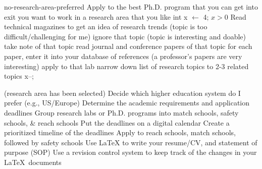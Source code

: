 \begin{codebox}
\zi	{}
\zi	{}
\zi
\li \If no-research-area-preferred	\label{apply-grad-sch-no-research-area1}
\li	\Then Apply to the best Ph.D. program that you can get into	\label{apply-grad-sch-no-research-area2}
\li	exit					
\li \ElseIf you want to work in a research area that you like
\zi	\Then
\li	int x $\gets$ 4;
\zi
\li	\While $x > 0$
	\Do
\li		Read technical magazines to get an idea of research trends
\zi		{}
\zi
\li		\If (topic is too difficult/challenging for me)
		\Then
\li			ignore that topic
\li		\ElseIf (topic is interesting and doable)
		\Then
\li			take note of that topic
\li			read journal and conference papers of that topic
\li			for each paper, enter it into your database of references		\label{apply-grad-sch-db-ref}
\zi			
\li			\If (a professor's papers are very interesting)
			\Then
\li				apply to that lab
			\End
		\End
\zi
\li		narrow down list of research topics to 2-3 related topics
\zi		{}
\li		x--;	\label{apply-grad-sch-pick-research-area}
	\End
\zi \End

\li \If (research area has been selected)
	\Then
\li	Decide which higher education system do I prefer (e.g., US/Europe)
\li	Determine the academic requirements and application deadlines		\label{apply-grad-sch-international-deadlines}
\li	Group research labs or Ph.D. programs into match schools, safety schools, \& reach schools
\zi	{}
\zi	{}
\zi	{}
\zi
\li	Put the deadlines on a digital calendar	
\li	Create a prioritized timeline of the deadlines		
\li	Apply to reach schools, match schools, followed by safety schools	\label{apply-grad-sch-types-of}
\li	Use LaTeX to write your resume/CV, and statement of purpose (SOP)	\label{apply-grad-sch-LaTeX}
\li	Use a revision control system to keep track of the changes in your \LaTeX\ documents	\label{apply-grad-sch-rcs}
\zi \End
\end{codebox}